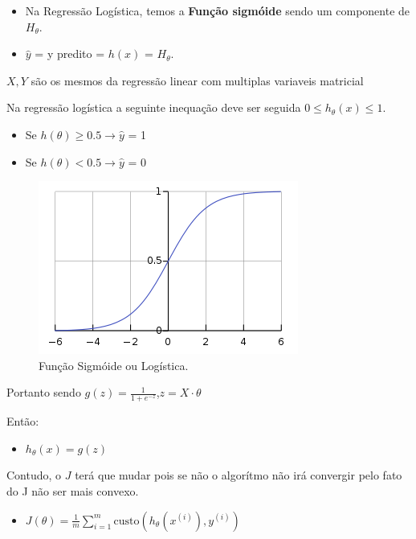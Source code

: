 \documentclass[12pt]{article}
\providecommand{\tightlist}{%
\setlength{\itemsep}{0pt}\setlength{\parskip}{0pt}}
\def\lt{<}
\begin{document}
\begin{itemize}
\item
  Na Regressão Logística, temos a \textbf{Função sigmóide} sendo um
  componente de \(H_{\theta}\).
\item
  \(\hat y\) = y predito = \(h(x)\) = \(H_{\theta}\).
\end{itemize}

\(X,Y\) são os mesmos da regressão linear com multiplas variaveis
matricial

Na regressão logística a seguinte inequação deve ser seguida
\(0 \leq h_\theta(x) \leq 1\).

\begin{itemize}
\item
  Se \(h(\theta) \geq 0.5 \to \hat y\) = 1
\item
  Se \(h(\theta) \lt 0.5 \to \hat y\) = 0
\end{itemize}

\begin{figure}
  \centering
  \includegraphics[width=0.7\linewidth]{imgs/curve-logistic.png}
  \caption{Função Sigmóide ou Logística.}
\end{figure}

Portanto sendo \(g(z)=\frac{1}{1+e^{-z}}\),\(z=X\cdot\theta\)

Então:

\begin{itemize}
\tightlist
\item
  \(h_\theta(x)=g(z)\)
\end{itemize}

Contudo, o \(J\) terá que mudar pois se não o algorítmo não irá
convergir pelo fato do J não ser mais convexo.

\begin{itemize}
\tightlist
\item
  \(J(\theta)=\frac{1}{m}\sum\limits_{i=1}^{m}\text{custo}(h_\theta(x^{(i)}),y^{(i)})\)
\end{itemize}
\end{document}
